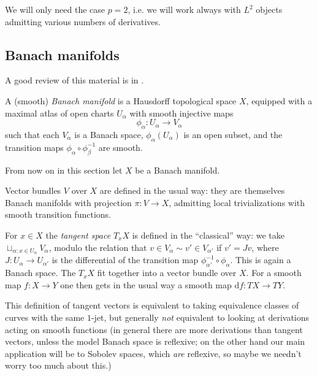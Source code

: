\documentclass[12pt,letterpaper,reqno]{article}
\numberwithin{equation}{section}
\newcommand{\de}{\mathrm{d}}
\newcommand{\ti}[1]{\textit{#1}}
\begin{document}
We will only need the case $p=2$, i.e. we will work always with
$L^2$ objects admitting various numbers of derivatives.


\subsection{Banach manifolds}

A good review of this material is in \cite{MR0158410}.

\begin{defn} A (smooth) \ti{Banach manifold} is
a Hausdorff topological space $X$, equipped with a maximal
atlas of open charts $U_\alpha$ with smooth injective maps
\begin{equation}
  \phi_\alpha: U_\alpha \to V_\alpha
\end{equation}
such that each $V_\alpha$ is a Banach space, $\phi_\alpha(U_\alpha)$
is an open subset, and the transition maps $\phi_\alpha \circ \phi_\beta^{-1}$
are smooth.
\end{defn}

From now on in this section let $X$ be a Banach manifold.

\begin{defn} Vector bundles $V$ over $X$
are defined in the usual way: they are themselves Banach manifolds
with projection $\pi: V \to X$, admitting local trivializations with
smooth transition functions.
\end{defn}

\begin{defn} For $x \in X$ the \ti{tangent space} $T_x X$
is defined in the ``classical'' way: we take
$\sqcup_{\alpha: x \in U_\alpha} V_\alpha$, modulo
the relation that $v \in V_\alpha \sim v' \in V_{\alpha'}$ if
$v' = Jv$, where $J: U_\alpha \to U_{\alpha'}$ is the differential
of the transition map $\phi_{\alpha'}^{-1} \circ \phi_\alpha$.
This is again a Banach space. The $T_x X$ fit together into a vector bundle
over $X$. For a smooth map $f: X \to Y$ one then gets in the usual
way a smooth map $\de f: TX \to TY$.
\end{defn}

This definition of tangent vectors is equivalent to taking
equivalence classes of curves with the same $1$-jet,
but generally \ti{not} equivalent to looking at derivations acting on
smooth functions (in general there are more derivations
than tangent vectors, unless the model Banach space
is reflexive; on the other hand our main application will
be to Sobolev spaces, which \ti{are} reflexive, so maybe
we needn't worry too much about this.)
\end{document}
